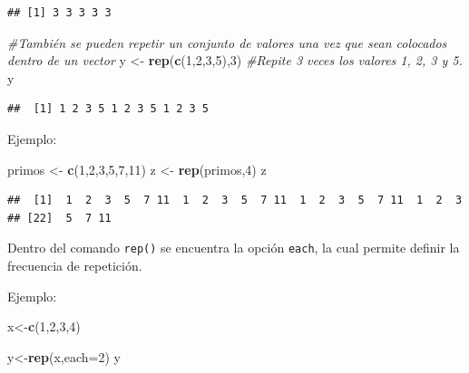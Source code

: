 \documentclass[
]{book}
\newenvironment{Shaded}{\begin{snugshade}}{\end{snugshade}}
\newcommand{\AttributeTok}[1]{\textcolor[rgb]{0.13,0.29,0.53}{#1}}
\newcommand{\CommentTok}[1]{\textcolor[rgb]{0.56,0.35,0.01}{\textit{#1}}}
\newcommand{\DecValTok}[1]{\textcolor[rgb]{0.00,0.00,0.81}{#1}}
\newcommand{\FunctionTok}[1]{\textcolor[rgb]{0.13,0.29,0.53}{\textbf{#1}}}
\newcommand{\NormalTok}[1]{#1}
\newcommand{\OtherTok}[1]{\textcolor[rgb]{0.56,0.35,0.01}{#1}}
\begin{document}
\begin{verbatim}
## [1] 3 3 3 3 3
\end{verbatim}

\begin{Shaded}
\begin{Highlighting}[]
\CommentTok{\#También se pueden repetir un conjunto de valores una vez que sean colocados dentro de un vector}
\NormalTok{y }\OtherTok{\textless{}{-}} \FunctionTok{rep}\NormalTok{(}\FunctionTok{c}\NormalTok{(}\DecValTok{1}\NormalTok{,}\DecValTok{2}\NormalTok{,}\DecValTok{3}\NormalTok{,}\DecValTok{5}\NormalTok{),}\DecValTok{3}\NormalTok{) }\CommentTok{\#Repite 3 veces los valores 1, 2, 3 y 5. }
\NormalTok{y}
\end{Highlighting}
\end{Shaded}

\begin{verbatim}
##  [1] 1 2 3 5 1 2 3 5 1 2 3 5
\end{verbatim}

Ejemplo:

\begin{Shaded}
\begin{Highlighting}[]
\NormalTok{primos }\OtherTok{\textless{}{-}} \FunctionTok{c}\NormalTok{(}\DecValTok{1}\NormalTok{,}\DecValTok{2}\NormalTok{,}\DecValTok{3}\NormalTok{,}\DecValTok{5}\NormalTok{,}\DecValTok{7}\NormalTok{,}\DecValTok{11}\NormalTok{)}
\NormalTok{z }\OtherTok{\textless{}{-}} \FunctionTok{rep}\NormalTok{(primos,}\DecValTok{4}\NormalTok{)}
\NormalTok{z}
\end{Highlighting}
\end{Shaded}

\begin{verbatim}
##  [1]  1  2  3  5  7 11  1  2  3  5  7 11  1  2  3  5  7 11  1  2  3
## [22]  5  7 11
\end{verbatim}

Dentro del comando \texttt{rep()} se encuentra la opción \texttt{each}, la cual permite definir la frecuencia de repetición.

Ejemplo:

\begin{Shaded}
\begin{Highlighting}[]
\NormalTok{x}\OtherTok{\textless{}{-}}\FunctionTok{c}\NormalTok{(}\DecValTok{1}\NormalTok{,}\DecValTok{2}\NormalTok{,}\DecValTok{3}\NormalTok{,}\DecValTok{4}\NormalTok{)}

\NormalTok{y}\OtherTok{\textless{}{-}}\FunctionTok{rep}\NormalTok{(x,}\AttributeTok{each=}\DecValTok{2}\NormalTok{)}
\NormalTok{y}
\end{Highlighting}
\end{Shaded}
\end{document}
